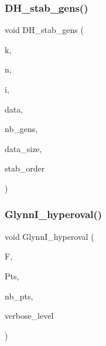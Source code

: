 \subsubsection{\texorpdfstring{D\+H\+\_\+stab\+\_\+gens()}{DH\_stab\_gens()}}
{\footnotesize\ttfamily void D\+H\+\_\+stab\+\_\+gens (\begin{DoxyParamCaption}\item[{\mbox{\hyperlink{galois_8h_a09fddde158a3a20bd2dcadb609de11dc}{I\+NT}}}]{k,  }\item[{\mbox{\hyperlink{galois_8h_a09fddde158a3a20bd2dcadb609de11dc}{I\+NT}}}]{n,  }\item[{\mbox{\hyperlink{galois_8h_a09fddde158a3a20bd2dcadb609de11dc}{I\+NT}}}]{i,  }\item[{\mbox{\hyperlink{galois_8h_a09fddde158a3a20bd2dcadb609de11dc}{I\+NT}} $\ast$\&}]{data,  }\item[{\mbox{\hyperlink{galois_8h_a09fddde158a3a20bd2dcadb609de11dc}{I\+NT}} \&}]{nb\+\_\+gens,  }\item[{\mbox{\hyperlink{galois_8h_a09fddde158a3a20bd2dcadb609de11dc}{I\+NT}} \&}]{data\+\_\+size,  }\item[{const \mbox{\hyperlink{galois_8h_ab6cc7b4aeb6ea31aba2b3fbfc83ff5e6}{B\+Y\+TE}} $\ast$\&}]{stab\+\_\+order }\end{DoxyParamCaption})}

\mbox{\label{data_8_c_ac21a0a43fa91ac7ce9b242a002f4e8bc}} 
\subsubsection{\texorpdfstring{Glynn\+I\+\_\+hyperoval()}{GlynnI\_hyperoval()}}
{\footnotesize\ttfamily void Glynn\+I\+\_\+hyperoval (\begin{DoxyParamCaption}\item[{\mbox{\hyperlink{classfinite__field}{finite\+\_\+field}} $\ast$}]{F,  }\item[{\mbox{\hyperlink{galois_8h_a09fddde158a3a20bd2dcadb609de11dc}{I\+NT}} $\ast$\&}]{Pts,  }\item[{\mbox{\hyperlink{galois_8h_a09fddde158a3a20bd2dcadb609de11dc}{I\+NT}} \&}]{nb\+\_\+pts,  }\item[{\mbox{\hyperlink{galois_8h_a09fddde158a3a20bd2dcadb609de11dc}{I\+NT}}}]{verbose\+\_\+level }\end{DoxyParamCaption})}

